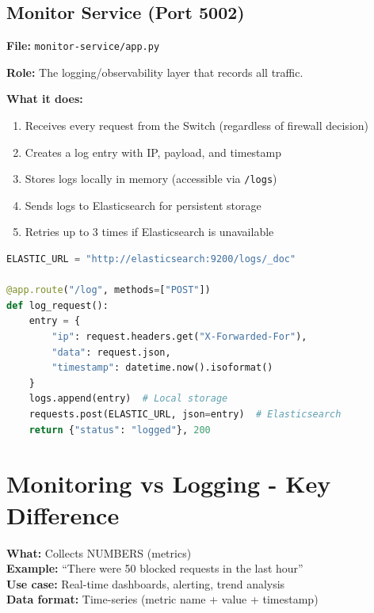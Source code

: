 \documentclass[12pt,a4paper]{article}
\begin{document}
\subsection{Monitor Service (Port 5002)}

\textbf{File:} \texttt{monitor-service/app.py}

\textbf{Role:} The logging/observability layer that records all traffic.

\textbf{What it does:}
\begin{enumerate}
    \item Receives every request from the Switch (regardless of firewall decision)
    \item Creates a log entry with IP, payload, and timestamp
    \item Stores logs locally in memory (accessible via \texttt{/logs})
    \item Sends logs to Elasticsearch for persistent storage
    \item Retries up to 3 times if Elasticsearch is unavailable
\end{enumerate}

\begin{lstlisting}[language=Python, caption=Monitor Logging Logic]
ELASTIC_URL = "http://elasticsearch:9200/logs/_doc"

@app.route("/log", methods=["POST"])
def log_request():
    entry = {
        "ip": request.headers.get("X-Forwarded-For"),
        "data": request.json,
        "timestamp": datetime.now().isoformat()
    }
    logs.append(entry)  # Local storage
    requests.post(ELASTIC_URL, json=entry)  # Elasticsearch
    return {"status": "logged"}, 200
\end{lstlisting}

\section{Monitoring vs Logging - Key Difference}

\begin{tcolorbox}[colback=blue!5, colframe=blue!50!black, title=Prometheus + Grafana (Monitoring)]
\textbf{What:} Collects NUMBERS (metrics)\\
\textbf{Example:} ``There were 50 blocked requests in the last hour''\\
\textbf{Use case:} Real-time dashboards, alerting, trend analysis\\
\textbf{Data format:} Time-series (metric name + value + timestamp)
\end{tcolorbox}
\end{document}
